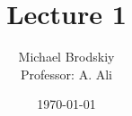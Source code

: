 


\title{Lecture 1}
\date{\today}
\author{Michael Brodskiy\\ \small Professor: A. Ali}



\maketitle

